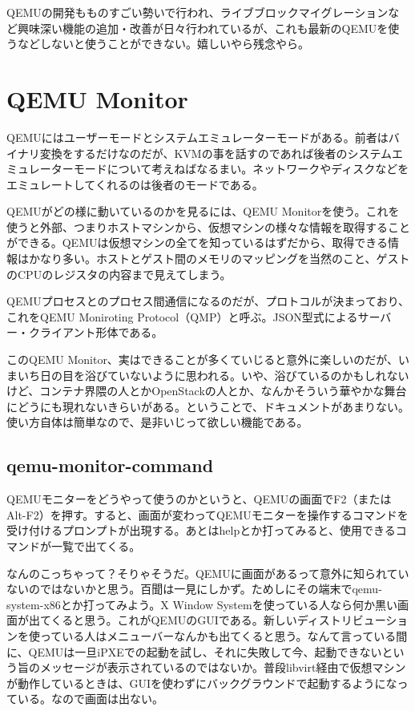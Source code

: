 ﻿\documentclass[9pt,b5paper,tombo,openany]{jsbook}
\begin{document}
QEMUの開発もものすごい勢いで行われ、ライブブロックマイグレーションなど興味深い機能の追加・改善が日々行われているが、これも最新のQEMUを使うなどしないと使うことができない。嬉しいやら残念やら。

\section{QEMU Monitor}

QEMUにはユーザーモードとシステムエミュレーターモードがある。前者はバイナリ変換をするだけなのだが、KVMの事を話すのであれば後者のシステムエミュレーターモードについて考えねばなるまい。ネットワークやディスクなどをエミュレートしてくれるのは後者のモードである。

QEMUがどの様に動いているのかを見るには、QEMU Monitorを使う。これを使うと外部、つまりホストマシンから、仮想マシンの様々な情報を取得することができる。QEMUは仮想マシンの全てを知っているはずだから、取得できる情報はかなり多い。ホストとゲスト間のメモリのマッピングを当然のこと、ゲストのCPUのレジスタの内容まで見えてしまう。

QEMUプロセスとのプロセス間通信になるのだが、プロトコルが決まっており、これをQEMU Moniroting Protocol（QMP）と呼ぶ。JSON型式によるサーバー・クライアント形体である。

このQEMU Monitor、実はできることが多くていじると意外に楽しいのだが、いまいち日の目を浴びていないように思われる。いや、浴びているのかもしれないけど、コンテナ界隈の人とかOpenStackの人とか、なんかそういう華やかな舞台にどうにも現れないきらいがある。ということで、ドキュメントがあまりない。使い方自体は簡単なので、是非いじって欲しい機能である。

\subsection{qemu-monitor-command}

QEMUモニターをどうやって使うのかというと、QEMUの画面でF2（またはAlt-F2）を押す。すると、画面が変わってQEMUモニターを操作するコマンドを受け付けるプロンプトが出現する。あとはhelpとか打ってみると、使用できるコマンドが一覧で出てくる。

なんのこっちゃって？そりゃそうだ。QEMUに画面があるって意外に知られていないのではないかと思う。百聞は一見にしかず。ためしにその端末でqemu-system-x86とか打ってみよう。X Window Systemを使っている人なら何か黒い画面が出てくると思う。これがQEMUのGUIである。新しいディストリビューションを使っている人はメニューバーなんかも出てくると思う。なんて言っている間に、QEMUは一旦iPXEでの起動を試し、それに失敗して今、起動できないという旨のメッセージが表示されているのではないか。普段libvirt経由で仮想マシンが動作しているときは、GUIを使わずにバックグラウンドで起動するようになっている。なので画面は出ない。
\end{document}
